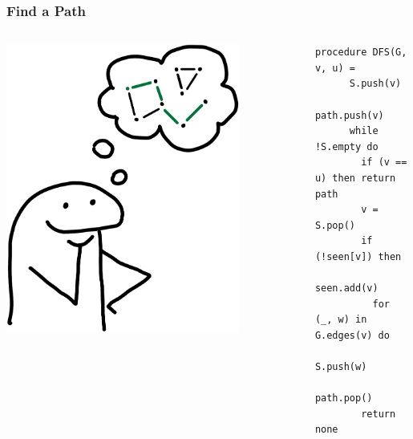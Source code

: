 \documentclass[xcolor={dvipsnames}, aspectratio=169]{beamer}
\begin{document}
\begin{frame}[fragile]
  \frametitle{Find a Path}
  \begin{columns}    
    \begin{column}{0.35\textwidth}
      \centering
      \includegraphics[width=0.8\textwidth]{pic/pathAns.jpg}
    \end{column}
    \begin{column}{0.75\textwidth} 
      \begin{lstlisting}[language=imperative]
    procedure DFS(G, v, u) = 
      S.push(v)
      path.push(v)
      while !S.empty do
        if (v == u) then return path
        v = S.pop()
        if (!seen[v]) then
          seen.add(v)
          for (_, w) in G.edges(v) do 
            S.push(w)
        path.pop()
        return none
      \end{lstlisting}
    \end{column}
    \end{columns}
\end{frame}
\end{document}
